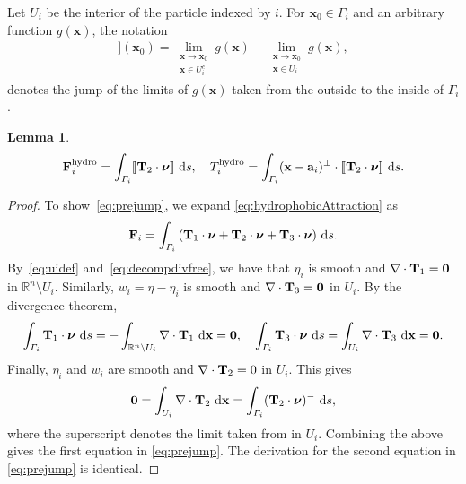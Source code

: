 \documentclass[lineno]{jfm}
\newtheorem{lemma}{Lemma}
\renewcommand{\aa}{\mathbf{a}}
\newcommand{\FF}{\mathbf{F}}
\newcommand{\nnu}{\boldsymbol{\nu}}
\newcommand{\xx}{\mathbf{x}}
\newcommand{\jump}[1]{[\![ #1 ]\!]}
\begin{document}
Let $U_i$ be the interior of the particle indexed by $i$. For $\xx_0
\in \Gamma_i$ and an arbitrary function $g(\xx)$, the notation
\begin{align}
  \jump{g}(\xx_0) = \lim_{\substack{\xx \to \xx_0 \\ \xx \in U_i^c}}g(\xx)  - 
                    \lim_{\substack{\xx \to \xx_0 \\ \xx \in U_i}}g(\xx),
\end{align}
denotes the jump of the limits of $g(\xx)$ taken from the outside to
the inside of $\Gamma_i$.
\begin{lemma}
\begin{align}
  \label{eq:prejump}
  \FF_i^{\mathrm{hydro}} = \int_{\Gamma_i} \jump{{\bf T}_2 \cdot \nnu}  \, \dif s,\quad
  T_i^{\mathrm{hydro}} = \int_{\Gamma_i} (\xx - \aa_i)^{\perp} \cdot
  \jump{{\bf T}_2 \cdot \nnu} \, \dif s.
\end{align}
\end{lemma}
\begin{proof}
To show~\eqref{eq:prejump}, we expand \eqref{eq:hydrophobicAttraction} as
\begin{align}
  \FF_i = \int_{\Gamma_i} \left({\bf T}_1 \cdot \nnu + 
    {\bf T}_2 \cdot \nnu + {\bf T}_3 \cdot \nnu \right) \,\dif s.
\end{align}
By~\eqref{eq:uidef} and~\eqref{eq:decompdivfree}, we have that $\eta_i$ is
smooth and $\nabla \cdot {\bf T}_1 = \mathbf{0}$ in $\mathbb{R}^n
\setminus U_i$. Similarly, $w_i = \eta  - \eta _i$ is smooth and $\nabla \cdot
{\bf T}_3 = \mathbf{0}$ in $\overline{U}_i$. By the divergence theorem,  
\begin{align}
  \int_{\Gamma_i}  {\bf T}_1 \cdot \nnu \,\dif s
  = -\int_{\mathbb{R}^n \setminus U_i} \nabla \cdot {\bf T}_1 \,\dif \xx = \mathbf{0},\quad
    \int_{\Gamma_i}  {\bf T}_3 \cdot \nnu\,\dif s
  = \int_{U_i} \nabla \cdot {\bf T}_3 \,\dif \xx = \mathbf{0}.
\end{align}
Finally, $\eta_i$ and $w_i$ are smooth and $\nabla \cdot {\bf T}_2= 0$ in $U_i$. This gives
\begin{align}
  \mathbf{0} = \int_{U_i} \nabla \cdot {\bf T}_2 \, \dif \xx = \int_{\Gamma_i}  
    ({\bf T}_2 \cdot \nnu)^-\,\dif s,
\end{align}
where the superscript denotes the limit taken from in $U_i$.  
Combining the above gives the first equation in \eqref{eq:prejump}.
The derivation for the second equation in \eqref{eq:prejump} is identical. 
\end{proof}
\end{document}
